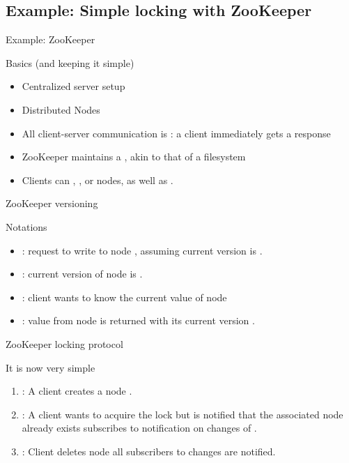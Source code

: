 \subsection{Example: Simple locking with ZooKeeper}
\begin{frame}{Example: ZooKeeper}
  \begin{block}{Basics (and keeping it simple)}
    \begin{itemize}\firmlist
      \item Centralized server setup
      \item Distributed Nodes
      \item All client-server communication is : a client immediately gets a response
      \item ZooKeeper maintains a , akin to that of a filesystem
      \item Clients can , , or  nodes, as well as .
    \end{itemize}
  \end{block}
\end{frame}
\begin{frame}{ZooKeeper versioning}
  \begin{centerfig}
  \end{centerfig}

  \begin{block}{Notations}
    \begin{itemize}\firmlist
      \item {}: request to write  to node , assuming current version is .
      \item {}: current version of node  is .
      \item {}: client wants to know the current value of node 
      \item {}: value  from node  is returned with its current version .
    \end{itemize}
  \end{block}
\end{frame}
\begin{frame}{ZooKeeper locking protocol}
  \begin{block}{It is now very simple}
    \begin{enumerate}\firmlist
      \item {}: A client  creates a node .
      \item {}: A client  wants to acquire the lock but is notified that the associated node
            already exists \mathexpr{\Rightarrow}  subscribes to notification on changes of .
      \item {}: Client  deletes node  \mathexpr{\Rightarrow} all subscribers to
            changes are notified.
    \end{enumerate}


  \end{block}
\end{frame}
